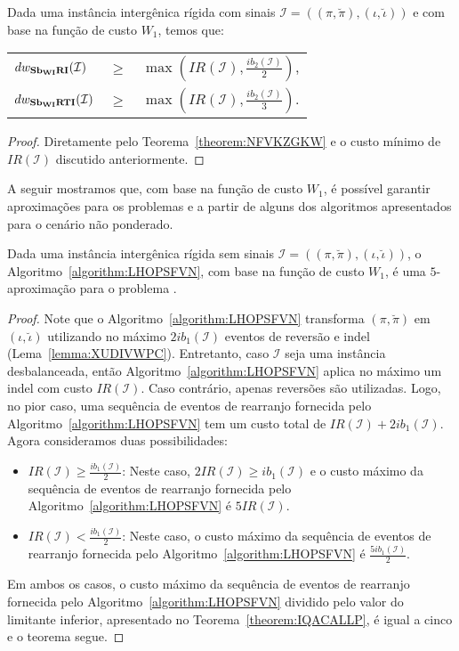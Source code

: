 \begin{theorem}\label{theorem:BOZETXBS}
Dada uma instância intergênica rígida com sinais $\mathcal{I}=((\pi,\breve\pi),(\iota,\breve\iota))$ e com base na função de custo $W_1$, temos que:

\begin{tabular}{lll}
  $dw_{\textbf{Sb\textsubscript{WI}RI}}(\mathcal{I})$      & $ \ge $ & $\max(IR(\mathcal{I}),\frac{ib_2(\mathcal{I})}{2})$, \\ 
  $dw_{\textbf{Sb\textsubscript{WI}RTI}}(\mathcal{I})$     & $ \ge $ & $\max(IR(\mathcal{I}),\frac{ib_2(\mathcal{I})}{3})$.
\end{tabular}
\begin{proof}
Diretamente pelo Teorema~\ref{theorem:NFVKZGKW} e o custo mínimo de $IR(\mathcal{I})$ discutido anteriormente.
\end{proof}
\end{theorem}

A seguir mostramos que, com base na função de custo $W_1$, é possível garantir aproximações para os problemas \SbWIRI{} e \SbWIRTI{} a partir de alguns dos algoritmos apresentados para o cenário não ponderado.

\begin{theorem}\label{theorem:BNWIOUVG}
Dada uma instância intergênica rígida sem sinais $\mathcal{I}=((\pi,\breve\pi),(\iota,\breve\iota))$, o Algoritmo~\ref{algorithm:LHOPSFVN}, com base na função de custo $W_1$, é uma $5$-aproximação para o problema \SbWIRI{}.
\end{theorem}
\begin{proof}
Note que o Algoritmo~\ref{algorithm:LHOPSFVN} transforma $(\pi,\breve\pi)$ em $(\iota,\breve\iota)$ utilizando no máximo $2ib_1(\mathcal{I})$ eventos de reversão e indel (Lema~\ref{lemma:XUDIVWPC}). Entretanto, caso $\mathcal{I}$ seja uma instância desbalanceada, então Algoritmo~\ref{algorithm:LHOPSFVN} aplica no máximo um indel com custo $IR(\mathcal{I})$. Caso contrário, apenas reversões são utilizadas. Logo, no pior caso, uma sequência de eventos de rearranjo fornecida pelo Algoritmo~\ref{algorithm:LHOPSFVN} tem um custo total de $IR(\mathcal{I}) + 2ib_1(\mathcal{I})$. Agora consideramos duas possibilidades:
\begin{itemize}
  \item $IR(\mathcal{I}) \ge \frac{ib_1(\mathcal{I})}{2}$: Neste caso, $2IR(\mathcal{I}) \ge ib_1(\mathcal{I})$ e o custo máximo da sequência de eventos de rearranjo fornecida pelo Algoritmo~\ref{algorithm:LHOPSFVN} é $5IR(\mathcal{I})$.
  \item $IR(\mathcal{I}) < \frac{ib_1(\mathcal{I})}{2}$: Neste caso, o custo máximo da sequência de eventos de rearranjo fornecida pelo Algoritmo~\ref{algorithm:LHOPSFVN} é $\frac{5ib_1(\mathcal{I})}{2}$.
\end{itemize}
Em ambos os casos, o custo máximo da sequência de eventos de rearranjo fornecida pelo Algoritmo~\ref{algorithm:LHOPSFVN} dividido pelo valor do limitante inferior, apresentado no Teorema~\ref{theorem:IQACALLP}, é igual a cinco e o teorema segue.
\end{proof}


